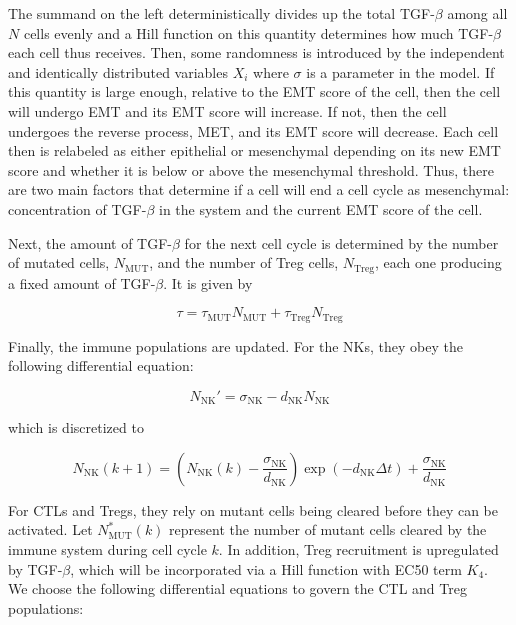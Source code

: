 \documentclass[11pt]{article}
\begin{document}
The summand on the left deterministically divides up the total TGF-$\beta$ among all $N$ cells evenly and a Hill function on this quantity determines how much TGF-$\beta$ each cell thus receives.
Then, some randomness is introduced by the independent and identically distributed variables $X_i$ where $\sigma$ is a parameter in the model.
If this quantity is large enough, relative to the EMT score of the cell, then the cell will undergo EMT and its EMT score will increase.
If not, then the cell undergoes the reverse process, MET, and its EMT score will decrease.
Each cell then is relabeled as either epithelial or mesenchymal depending on its new EMT score and whether it is below or above the mesenchymal threshold.
Thus, there are two main factors that determine if a cell will end a cell cycle as mesenchymal: concentration of TGF-$\beta$ in the system and the current EMT score of the cell.

Next, the amount of TGF-$\beta$ for the next cell cycle is determined by the number of mutated cells, $N_{\text{MUT}}$, and the number of Treg cells, $N_{\text{Treg}}$, each one producing a fixed amount of TGF-$\beta$. It is given by

\begin{equation}\tag{2.6}
\tau = \tau_{\text{MUT}}N_{\text{MUT}} + \tau_{\text{Treg}}N_{\text{Treg}}
\end{equation}


Finally, the immune populations are updated.
For the NKs, they obey the following differential equation:
 
\begin{equation}\tag{2.7}
N_{\text{NK}}' = \sigma_{\text{NK}} - d_{\text{NK}}N_{\text{NK}}
\end{equation}

which is discretized to
 
 \begin{equation}\tag{2.8}
N_{\text{NK}}(k+1) = \left (N_{\text{NK}}(k)-\frac{\sigma_{\text{NK}}}{d_{\text{NK}}} \right )\exp(-d_{\text{NK}}\Delta t)+\frac{\sigma_{\text{NK}}}{d_{\text{NK}}}
\end{equation}

For CTLs and Tregs, they rely on mutant cells being cleared before they can be activated.
Let $N_{\text{MUT}}^*(k)$ represent the number of mutant cells cleared by the immune system during cell cycle $k$.
In addition, Treg recruitment is upregulated by TGF-$\beta$, which will be incorporated via a Hill function with EC50 term $K_4$.
We choose the following differential equations to govern the CTL and Treg populations:
\end{document}
